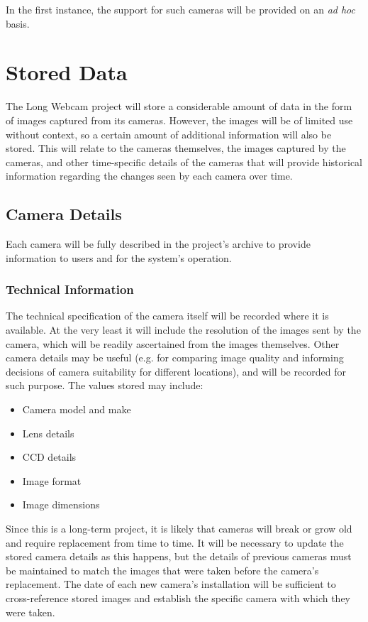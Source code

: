 \documentclass[11pt]{article}
\begin{document}
In the first instance, the support for such cameras will be provided on an \textit{ad hoc} basis.

\clearpage
\section{Stored Data}

The Long Webcam project will store a considerable amount of data in the form of images captured from its cameras. However, the images will be of limited use without context, so a certain amount of additional information will also be stored. This will relate to the cameras themselves, the images captured by the cameras, and other time-specific details of the cameras that will provide historical information regarding the changes seen by each camera over time.

\subsection{Camera Details}

Each camera will be fully described in the project's archive to provide information to users and for the system's operation.

\subsubsection{Technical Information}

The technical specification of the camera itself will be recorded where it is available. At the very least it will include the resolution of the images sent by the camera, which will be readily ascertained from the images themselves. Other camera details may be useful (e.g. for comparing image quality and informing decisions of camera suitability for different locations), and will be recorded for such purpose. The values stored may include:

\begin{itemize}
\item Camera model and make
\item Lens details
\item CCD details
\item Image format
\item Image dimensions
\end{itemize}

Since this is a long-term project, it is likely that cameras will break or grow old and require replacement from time to time. It will be necessary to update the stored camera details as this happens, but the details of previous cameras must be maintained to match the images that were taken before the camera's replacement. The date of each new camera's installation will be sufficient to cross-reference stored images and establish the specific camera with which they were taken.
\end{document}

